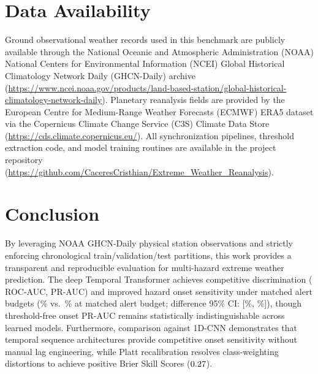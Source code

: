 \documentclass[conference]{IEEEtran}
\begin{document}
\section{Data Availability}
\label{sec:data_availability}
Ground observational weather records used in this benchmark are publicly available through the National Oceanic and Atmospheric Administration (NOAA) National Centers for Environmental Information (NCEI) Global Historical Climatology Network Daily (GHCN-Daily) archive (\url{https://www.ncei.noaa.gov/products/land-based-station/global-historical-climatology-network-daily}). Planetary reanalysis fields are provided by the European Centre for Medium-Range Weather Forecasts (ECMWF) ERA5 dataset via the Copernicus Climate Change Service (C3S) Climate Data Store (\url{https://cds.climate.copernicus.eu/}). All synchronization pipelines, threshold extraction code, and model training routines are available in the project repository (\url{https://github.com/CaceresCristhian/Extreme_Weather_Reanalysis}).

\section{Conclusion}
By leveraging NOAA GHCN-Daily physical station observations and strictly enforcing chronological train/validation/test partitions, this work provides a transparent and reproducible evaluation for multi-hazard extreme weather prediction. The deep Temporal Transformer achieves competitive discrimination (\aucDeep{} ROC-AUC, \prAucDeep{} PR-AUC) and improved hazard onset sensitivity under matched alert budgets (\onsetRecMatchedDeep{}\% vs.~\onsetRecMatchedHgb{}\% at matched alert budget; difference 95\% CI: [\ciOnsetRecHgbLow{}\%, \ciOnsetRecHgbHigh{}\%]), though threshold-free onset PR-AUC remains statistically indistinguishable across learned models. Furthermore, comparison against 1D-CNN demonstrates that temporal sequence architectures provide competitive onset sensitivity without manual lag engineering, while Platt recalibration resolves class-weighting distortions to achieve positive Brier Skill Scores ($0.27{}$).



\end{document}
